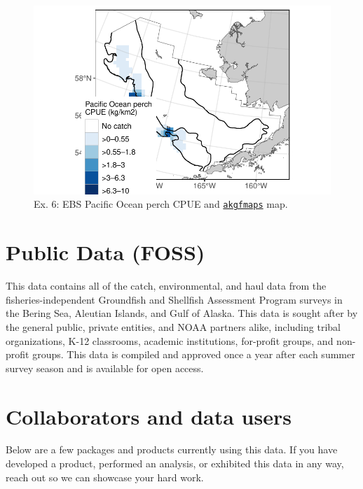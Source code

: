 \documentclass[
  letterpaper,
  oneside,
  open=any]{scrbook}
\begin{document}
\begin{figure}[H]

{\centering \includegraphics{content/akfin-oracle-sql-r_files/figure-pdf/test-6-fig-1.pdf}

}

\caption{Ex. 6: EBS Pacific Ocean perch CPUE and
\href{https://github.com/afsc-gap-products/akgfmaps}{\texttt{akgfmaps}}
map.}

\end{figure}

\part{Public Data (FOSS)}

This data contains all of the catch, environmental, and haul data from
the fisheries-independent Groundfish and Shellfish Assessment Program
surveys in the Bering Sea, Aleutian Islands, and Gulf of Alaska. This
data is sought after by the general public, private entities, and NOAA
partners alike, including tribal organizations, K-12 classrooms,
academic institutions, for-profit groups, and non-profit groups. This
data is compiled and approved once a year after each summer survey
season and is available for open access.

\part{Collaborators and data users}

Below are a few packages and products currently using this data. If you
have developed a product, performed an analysis, or exhibited this data
in any way, reach out so we can showcase your hard work.
\end{document}
